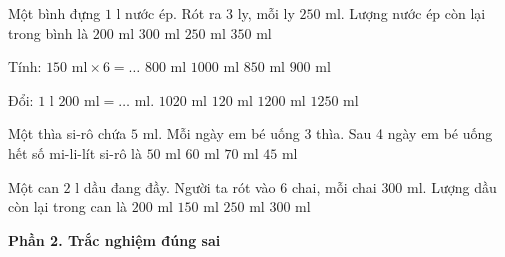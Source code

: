 \begin{ex} %
Một bình đựng $1\text{ l}$ nước ép. Rót ra 3 ly, mỗi ly $250\text{ ml}$. Lượng nước ép còn lại trong bình là
\choice
{$200\text{ ml}$}
{$300\text{ ml}$}
{\True $250\text{ ml}$}
{$350\text{ ml}$}
\end{ex}

\begin{ex} %
Tính: $150\text{ ml} \times 6 = \dots$
\choice
{$800\text{ ml}$}
{$1000\text{ ml}$}
{$850\text{ ml}$}
{\True $900\text{ ml}$}
\end{ex}

\begin{ex} %
Đổi: $1\text{ l } 200\text{ ml} = \dots\text{ ml}$.
\choice
{$1020\text{ ml}$}
{$120\text{ ml}$}
{\True $1200\text{ ml}$}
{$1250\text{ ml}$}
\end{ex}

\begin{ex} %
Một thìa si-rô chứa $5\text{ ml}$. Mỗi ngày em bé uống 3 thìa. Sau 4 ngày em bé uống hết số mi-li-lít si-rô là
\choice
{$50\text{ ml}$}
{\True $60\text{ ml}$}
{$70\text{ ml}$}
{$45\text{ ml}$}
\end{ex}

\begin{ex} %
Một can $2\text{ l}$ dầu đang đầy. Người ta rót vào 6 chai, mỗi chai $300\text{ ml}$. Lượng dầu còn lại trong can là
\choice
{\True $200\text{ ml}$}
{$150\text{ ml}$}
{$250\text{ ml}$}
{$300\text{ ml}$}
\end{ex}

\textbf{Phần 2. Trắc nghiệm đúng sai}

